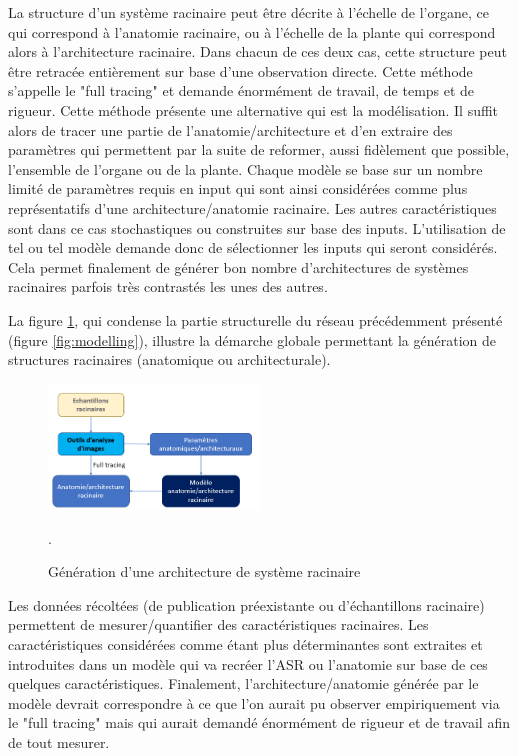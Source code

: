 La structure d'un système racinaire peut être décrite à l'échelle de l'organe, ce qui correspond à l'anatomie racinaire, ou à l'échelle de la plante qui correspond alors à l'architecture racinaire.
Dans chacun de ces deux cas, cette structure peut être retracée entièrement sur base d'une observation directe.
Cette méthode s'appelle le "full tracing" et demande énormément de travail, de temps et de rigueur.
Cette méthode présente une alternative qui est la modélisation.
Il suffit alors de tracer une partie de l'anatomie/architecture et d'en extraire des paramètres qui permettent par la suite de reformer, aussi fidèlement que possible, l'ensemble de l'organe ou de la plante.
Chaque modèle se base sur un nombre limité de paramètres requis en input qui sont ainsi considérées comme plus représentatifs d'une architecture/anatomie racinaire.
Les autres caractéristiques sont dans ce cas stochastiques ou construites sur base des inputs.
L'utilisation de tel ou tel modèle demande donc de sélectionner les inputs qui seront considérés.
Cela permet finalement de générer bon nombre d'architectures de systèmes racinaires parfois très contrastés les unes des autres.
\newline

La figure \ref{fig:structure generation}, qui condense la partie structurelle du réseau précédemment présenté (figure \ref{fig:modelling}), illustre la démarche globale permettant la génération de structures racinaires (anatomique ou architecturale).

\begin{figure}[ht]
\centering
\includegraphics[width=0.5\textwidth]{Image/structure generation.png}
\caption{Génération d'une architecture de système racinaire}.
\label{fig:structure generation}
\end{figure}

Les données récoltées (de publication préexistante ou d'échantillons racinaire) permettent de mesurer/quantifier des caractéristiques racinaires.
Les caractéristiques considérées comme étant plus déterminantes sont extraites et introduites dans un modèle qui va recréer l'ASR ou l'anatomie sur base de ces quelques caractéristiques.
Finalement, l'architecture/anatomie générée par le modèle devrait correspondre à ce que l'on aurait pu observer empiriquement via le "full tracing" mais qui aurait demandé énormément de rigueur et de travail afin de tout mesurer.

